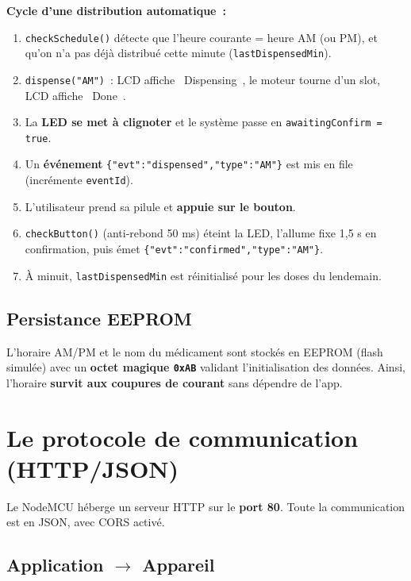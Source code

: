 \documentclass[11pt,a4paper]{article}
\begin{document}
\textbf{Cycle d'une distribution automatique~:}
\begin{enumerate}
  \item \texttt{checkSchedule()} d\'etecte que l'heure courante = heure AM (ou PM), et
        qu'on n'a pas d\'ej\`a distribu\'e cette minute (\texttt{lastDispensedMin}).
  \item \texttt{dispense("AM")}~: LCD affiche \guillemotleft~Dispensing~\guillemotright,
        le moteur tourne d'un slot, LCD affiche \guillemotleft~Done~\guillemotright.
  \item La \textbf{LED se met \`a clignoter} et le syst\`eme passe en
        \texttt{awaitingConfirm = true}.
  \item Un \textbf{\'ev\'enement} \texttt{\{"evt":"dispensed","type":"AM"\}} est mis en
        file (incr\'emente \texttt{eventId}).
  \item L'utilisateur prend sa pilule et \textbf{appuie sur le bouton}.
  \item \texttt{checkButton()} (anti-rebond 50 ms) \'eteint la LED, l'allume fixe 1,5 s
        en confirmation, puis \'emet \texttt{\{"evt":"confirmed","type":"AM"\}}.
  \item \`A minuit, \texttt{lastDispensedMin} est r\'einitialis\'e pour les doses du lendemain.
\end{enumerate}

\subsection{Persistance EEPROM}

L'horaire AM/PM et le nom du m\'edicament sont stock\'es en EEPROM (flash simul\'ee) avec
un \textbf{octet magique \texttt{0xAB}} validant l'initialisation des donn\'ees. Ainsi,
l'horaire \textbf{survit aux coupures de courant} sans d\'ependre de l'app.

\section{Le protocole de communication (HTTP/JSON)}

Le NodeMCU h\'eberge un serveur HTTP sur le \textbf{port 80}. Toute la communication est
en JSON, avec CORS activ\'e.

\subsection{Application $\rightarrow$ Appareil}
\end{document}
